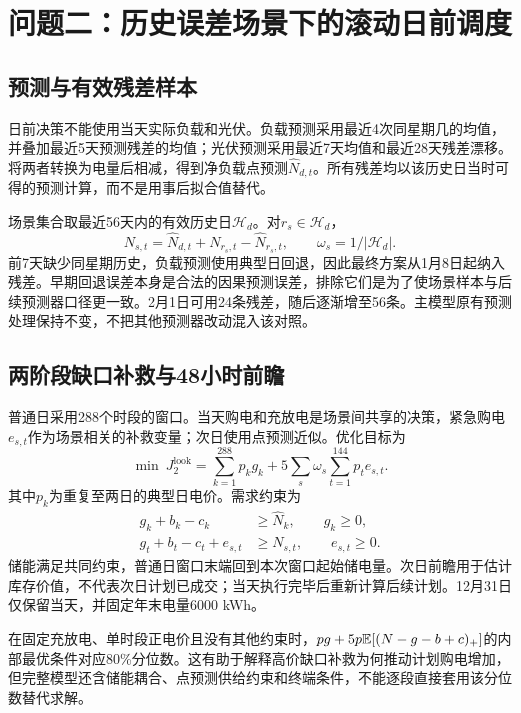 \section{问题二：历史误差场景下的滚动日前调度}
\subsection{预测与有效残差样本}
日前决策不能使用当天实际负载和光伏。负载预测采用最近4次同星期几的均值，并叠加最近5天预测残差的均值；光伏预测采用最近7天均值和最近28天残差漂移。将两者转换为电量后相减，得到净负载点预测$\widehat N_{d,t}$。所有残差均以该历史日当时可得的预测计算，而不是用事后拟合值替代。

场景集合取最近56天内的有效历史日$\mathcal H_d$。对$r_s\in\mathcal H_d$，
\begin{equation}
N_{s,t}=\widehat N_{d,t}+N_{r_s,t}-\widehat N_{r_s,t},\qquad
\omega_s=1/|\mathcal H_d|.\label{eq:residual}
\end{equation}
前7天缺少同星期历史，负载预测使用典型日回退，因此最终方案从1月8日起纳入残差。早期回退误差本身是合法的因果预测误差，排除它们是为了使场景样本与后续预测器口径更一致。2月1日可用24条残差，随后逐渐增至56条。主模型原有预测处理保持不变，不把其他预测器改动混入该对照。

\subsection{两阶段缺口补救与48小时前瞻}
普通日采用288个时段的窗口。当天购电和充放电是场景间共享的决策，紧急购电$e_{s,t}$作为场景相关的补救变量；次日使用点预测近似。优化目标为
\begin{equation}
\min\ J_2^{\mathrm{look}}=
\sum_{k=1}^{288}p_k g_k+
5\sum_s\omega_s\sum_{t=1}^{144}p_t e_{s,t}.\label{eq:q2}
\end{equation}
其中$p_k$为重复至两日的典型日电价。需求约束为
\begin{align}
g_k+b_k-c_k&\ge\widehat N_k,\qquad g_k\ge0,\\
g_t+b_t-c_t+e_{s,t}&\ge N_{s,t},\qquad e_{s,t}\ge0.
\end{align}
储能满足共同约束，普通日窗口末端回到本次窗口起始储电量。次日前瞻用于估计库存价值，不代表次日计划已成交；当天执行完毕后重新计算后续计划。12月31日仅保留当天，并固定年末电量6000 kWh。

在固定充放电、单时段正电价且没有其他约束时，$pg+5p\mathbb{E}[(N-g-b+c)_+]$的内部最优条件对应80\%分位数。这有助于解释高价缺口补救为何推动计划购电增加，但完整模型还含储能耦合、点预测供给约束和终端条件，不能逐段直接套用该分位数替代求解。

